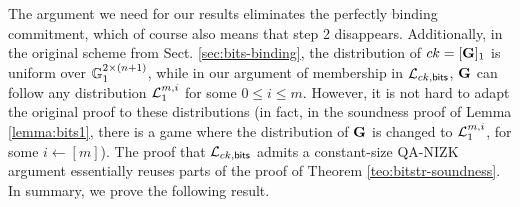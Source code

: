 The argument we need for our results eliminates the perfectly binding commitment, which of course also means that step 2 disappears. Additionally, in the original scheme from Sect. \ref{sec:bits-binding}, the distribution of $ck=[\mathbf{{G}}]_1$ is uniform over $\mathbb{G}_1^{2\times(n+1)}$, while in our argument of membership in 
$\mathcal{L}_{ck,\mathsf{bits}}$, $\mathbf{{G}}$ can follow any distribution $\mathcal{L}_1^{m,i}$ for some $0 \leq i \leq m$. 
However, it is not hard to adapt the original proof to these distributions (in fact, in the soundness proof of 
Lemma \ref{lemma:bits1}, there is a game where the distribution of $\mathbf{{G}}$ is changed to $\mathcal{L}_1^{m,i}$, for some $i \gets [m]$). The proof that $\mathcal{L}_{ck,\mathsf{bits}}$ admits a constant-size QA-NIZK argument essentially reuses parts of the proof of Theorem \ref{teo:bitstr-soundness}.  In summary, we prove the following result. 

